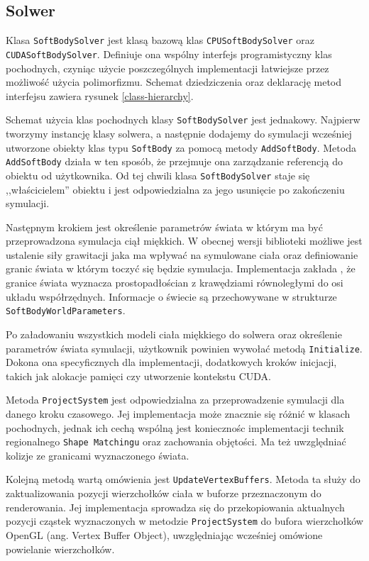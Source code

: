 {\subsection{Solwer}
Klasa \texttt{SoftBodySolver} jest klasą bazową klas \texttt{CPUSoftBodySolver}
oraz \texttt{CUDASoftBodySolver}. Definiuje ona wspólny interfejs
programistyczny klas pochodnych, czyniąc użycie poszczególnych
implementacji łatwiejsze przez możliwość użycia polimorfizmu. Schemat dziedziczenia
oraz deklarację metod interfejsu zawiera rysunek \ref{class-hierarchy}.

Schemat użycia klas pochodnych klasy \texttt{SoftBodySolver} jest jednakowy.
Najpierw tworzymy instancję klasy solwera, a następnie dodajemy do symulacji 
wcześniej utworzone obiekty klas typu \texttt{SoftBody} za pomocą metody
\texttt{AddSoftBody}. Metoda \texttt{AddSoftBody} działa w ten sposób, że
przejmuje ona zarządzanie referencją do obiektu od użytkownika. Od tej chwili
klasa \texttt{SoftBodySolver} staje się ,,właścicielem'' obiektu i jest
odpowiedzialna za jego usunięcie po zakończeniu symulacji.

Następnym krokiem jest określenie parametrów świata w którym ma być
przeprowadzona symulacja ciął miękkich. W obecnej wersji biblioteki możliwe jest
ustalenie siły grawitacji jaka ma wpływać na symulowane ciała oraz definiowanie
granic świata w którym toczyć się będzie symulacja. Implementacja zakłada
, że granice świata wyznacza prostopadłościan z krawędziami równoległymi
do osi układu współrzędnych. Informacje o świecie są przechowywane w strukturze
\texttt{SoftBodyWorldParameters}.

Po załadowaniu wszystkich modeli ciała miękkiego do solwera oraz określenie
parametrów świata symulacji, użytkownik powinien
wywołać metodą \texttt{Initialize}. Dokona ona specyficznych dla implementacji,
	dodatkowych kroków inicjacji, takich jak alokacje pamięci czy
	utworzenie kontekstu CUDA.

Metoda \texttt{ProjectSystem} jest odpowiedzialna za przeprowadzenie
symulacji dla danego kroku czasowego. Jej implementacja może znacznie się różnić
w klasach pochodnych, jednak ich cechą wspólną jest koniecznośc implementacji
technik regionalnego \texttt{Shape Matchingu} oraz zachowania objętości. Ma też
uwzględniać kolizje ze granicami wyznaczonego świata.

Kolejną metodą wartą omówienia jest \texttt{UpdateVertexBuffers}. Metoda ta
służy do zaktualizowania pozycji wierzchołków ciała w buforze przeznaczonym do
renderowania. Jej implementacja sprowadza się do przekopiowania aktualnych
pozycji cząstek wyznaczonych w metodzie \texttt{ProjectSystem} do bufora wierzchołków
OpenGL (ang. Vertex Buffer Object), uwzględniając wcześniej omówione powielanie wierzchołków.

}
